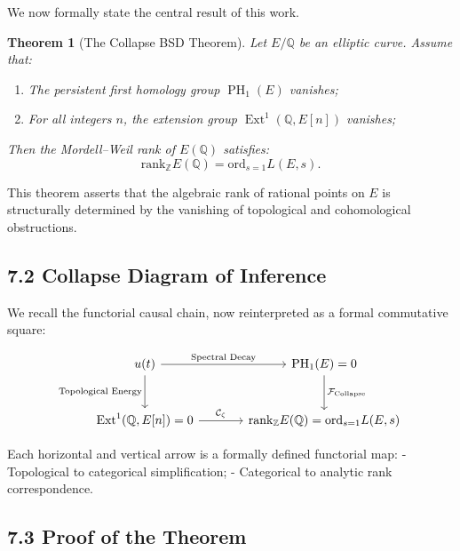 \documentclass[11pt]{article}
\newtheorem{theorem}{Theorem}[section]
\DeclareMathOperator{\Ext}{Ext}
\DeclareMathOperator{\PH}{PH}
\newcommand{\QQ}{\mathbb{Q}}
\newcommand{\ZZ}{\mathbb{Z}}
\begin{document}
We now formally state the central result of this work.

\begin{theorem}[The Collapse BSD Theorem]
\label{thm:collapse-bsd}
Let $E/\QQ$ be an elliptic curve.  
Assume that:

\begin{enumerate}
  \item The persistent first homology group $\PH_1(E)$ vanishes;
  \item For all integers $n$, the extension group $\Ext^1(\QQ,E[n])$ vanishes;
\end{enumerate}

Then the Mordell–Weil rank of $E(\QQ)$ satisfies:
\[
\mathrm{rank}_{\ZZ} E(\QQ) = \mathrm{ord}_{s=1} L(E,s).
\]
\end{theorem}

This theorem asserts that the algebraic rank of rational points on $E$ is structurally determined by the vanishing of topological and cohomological obstructions.

\subsection{7.2 Collapse Diagram of Inference}

We recall the functorial causal chain, now reinterpreted as a formal commutative square:

\[
\begin{tikzcd}[row sep=large, column sep=large]
u(t) \arrow[r, "\text{Spectral Decay}"] \arrow[d, "\text{Topological Energy}"']
& \PH_1(E) = 0 \arrow[d, "\mathcal{F}_{\mathrm{Collapse}}"] \\
\Ext^1(\QQ,E[n]) = 0 \arrow[r, "\mathcal{C}_{\zeta}"]
& \mathrm{rank}_{\ZZ} E(\QQ) = \mathrm{ord}_{s=1} L(E,s)
\end{tikzcd}
\]


Each horizontal and vertical arrow is a formally defined functorial map:
- Topological to categorical simplification;
- Categorical to analytic rank correspondence.

\subsection{7.3 Proof of the Theorem}
\end{document}
